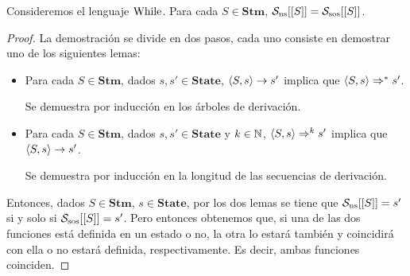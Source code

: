 \begin{theorem}
Consideremos el lenguaje $\mathrm{While}$. Para cada $S \in \mathbf{Stm}$, $\mathcal{S}_{\mathrm{ns}}[[S]] = \mathcal{S}_{\mathrm{sos}}[[S]]$.
\end{theorem}
\begin{proof}
La demostración se divide en dos pasos, cada uno consiste en demostrar uno de los siguientes lemas:
\begin{itemize}
\item Para cada $S \in \mathbf{Stm}$, dados $s, s' \in \mathbf{State}$, $\langle S, s \rangle\rightarrow s'$ implica que $\langle S, s \rangle\Rightarrow^* s'$.

Se demuestra por inducción en los árboles de derivación.

\item Para cada $S \in \mathbf{Stm}$, dados $s, s' \in \mathbf{State}$ y $k \in \mathbb{N}$, $\langle S, s \rangle\Rightarrow^k s'$ implica que $\langle S, s \rangle\to s'$.

Se demuestra por inducción en la longitud de las secuencias de derivación.
\end{itemize}

Entonces, dados $S \in \mathbf{Stm}$, $s\in \mathbf{State}$, por los dos lemas se tiene que $\mathcal{S}_{\mathrm{ns}}[[S]] = s'$ si y solo si $\mathcal{S}_{\mathrm{sos}}[[S]] = s'$. Pero entonces obtenemos que, si una de las dos funciones está definida en un estado o no, la otra lo estará también y coincidirá con ella o no estará definida, respectivamente. Es decir, ambas funciones coinciden.
\end{proof}



